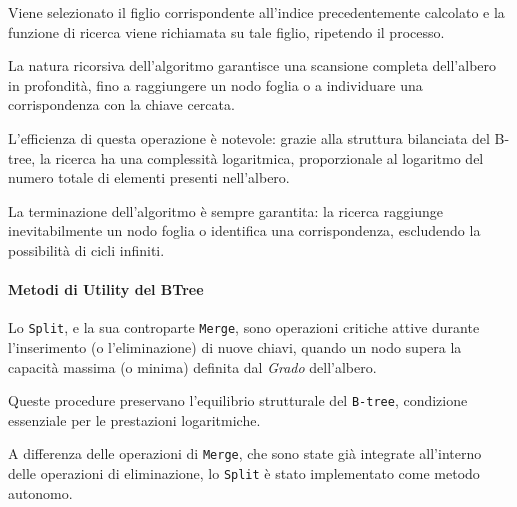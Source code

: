 \documentclass[12pt,a4paper,openright,twoside]{book}
\begin{document}
                    Viene selezionato il figlio corrispondente all'indice precedentemente calcolato e la funzione di ricerca viene richiamata su tale figlio, ripetendo il processo.

                    La natura ricorsiva dell'algoritmo garantisce una scansione completa dell'albero in profondità, fino a raggiungere un nodo foglia o a individuare una corrispondenza con la chiave cercata.

                    L'efficienza di questa operazione è notevole: grazie alla struttura bilanciata del B-tree, la ricerca ha una complessità logaritmica, proporzionale al logaritmo del numero totale di elementi presenti nell'albero.

                    \pagebreak

                    La terminazione dell'algoritmo è sempre garantita: la ricerca raggiunge inevitabilmente un nodo foglia o identifica una corrispondenza, escludendo la possibilità di cicli infiniti.

                    

                \paragraph{Metodi di Utility del BTree}

                    Lo \texttt{Split}, e la sua controparte \texttt{Merge}, sono operazioni critiche attive durante l'inserimento (o l'eliminazione) di nuove chiavi, quando un nodo supera la capacità massima (o minima) definita dal \textit{Grado} dell'albero.

                    Queste procedure preservano l'equilibrio strutturale del \texttt{B-tree}, condizione essenziale per le prestazioni logaritmiche.

                    A differenza delle operazioni di \texttt{Merge}, che sono state già integrate all'interno delle operazioni di eliminazione, lo \texttt{Split} è stato implementato come metodo autonomo.

                    \clearpage

                    
\end{document}
